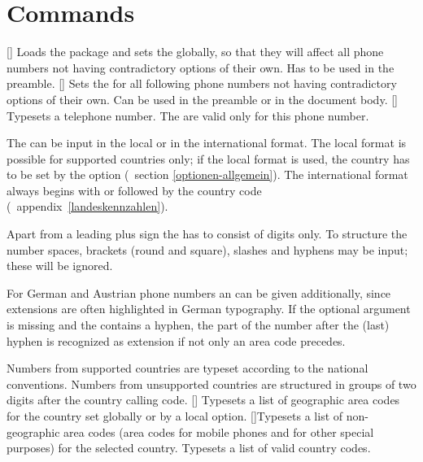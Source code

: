 \documentclass[numbers=noenddot]{scrreprt}
\newcommand*\vglAbschnitt[1]{(\cf\ section \ref{#1})}
\newcommand*\vglAnhang[1]{(\cf\ appendix~\ref{#1})}
\begin{document}
\section{Commands}
\begin{Befehlsliste}
[]
Loads the package and sets the  globally, so that they will affect all phone numbers not having contradictory options of their own. Has to be used in the preamble.
[]
Sets the  for all following phone numbers not having contradictory options of their own. Can be used in the preamble or in the document body.
[]
Typesets a telephone number. The  are valid only for this phone number.

The  can be input in the local or in the international format. The local format is possible for supported countries only; if the local format is used, the country has to be set by the
option
\vglAbschnitt{optionen-allgemein}.
The international format always begins with
\code{+}
or
followed by the country code
\vglAnhang{landeskennzahlen}.

Apart from a leading plus sign the  has to consist of digits only. To structure the number spaces, brackets (round and square), slashes and hyphens may be input; these will be ignored.

For German and Austrian phone numbers an  can be given additionally, since extensions are often highlighted in German typography. If the optional argument is missing and the  contains a hyphen, the part of the number after the (last) hyphen is recognized as extension if not only an area code precedes.

Numbers from supported countries are typeset according to the national conventions. Numbers from unsupported countries are structured in groups of two digits after the country calling code.
[]
Typesets a list of geographic area codes for the country set globally or by a local option.
[]{Typesets a list of non-geographic area codes (area codes for mobile phones and for other special purposes) for the selected country.}
Typesets a list of valid country codes.
\end{Befehlsliste}
\end{document}
